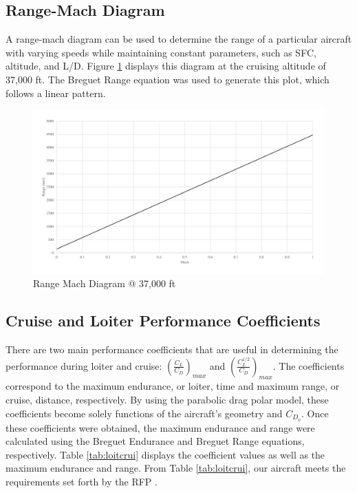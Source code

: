 \subsection{Range-Mach Diagram}
A range-mach diagram can be used to determine the range of a particular aircraft with varying speeds while maintaining constant parameters, such as SFC, altitude, and L/D. Figure \ref{ramadg} displays this diagram at the cruising altitude of 37,000 ft. The Breguet Range equation was used to generate this plot, which follows a linear pattern. 

\begin{figure}[H]
    \centering
    \includegraphics[width=1.0\textwidth]{Photos/Range_Mach.pdf}
    \caption{Range Mach Diagram @ 37,000 ft}
    \label{ramadg}
 \end{figure}

\subsection{Cruise and Loiter Performance Coefficients}
There are two main performance coefficients that are useful in determining the performance during loiter and cruise: $(\frac{C_{L}}{C_{D}})_{max}$ and $(\frac{C_{L}^{1/2}}{C_{D}})_{max}$. The coefficients correspond to the maximum endurance, or loiter, time and maximum range, or cruise, distance, respectively. By using the parabolic drag polar model, these coefficients become solely functions of the aircraft's geometry and $C_{D_{o}}$. Once these coefficients were obtained, the maximum endurance and range were calculated using the Breguet Endurance and Breguet Range equations, respectively. Table \ref{tab:loitcrui} displays the coefficient values as well as the maximum endurance and range. From Table \ref{tab:loitcrui}, our aircraft meets the requirements set forth by the RFP \cite{RFP}.

